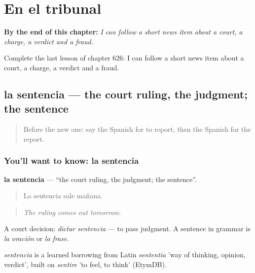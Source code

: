 
\chapter{En el tribunal}
\label{ch:es-en-el-tribunal}

\begin{chapteropening}
\textbf{By the end of this chapter:} \emph{I can follow a short news item about a court, a charge, a verdict and a fraud.}

Complete the last lesson of chapter 626: I can follow a short news item about a court, a charge, a verdict and a fraud.
\end{chapteropening}

\section[la sentencia]{la sentencia — the court ruling, the judgment; the sentence}

\label{lesson:ES-C626-sentencia}



\begin{quote}
Before the new one: say the Spanish for to report, then the Spanish for the report.
\end{quote}

\subsection*{You'll want to know: la sentencia}
\textbf{la sentencia} — \textquotedblleft{}the court ruling, the judgment; the sentence\textquotedblright{}.

\begin{quote}
La sentencia sale mañana.
\end{quote}

\begin{quote}
\emph{The ruling comes out tomorrow.}
\end{quote}

A court decision; \emph{dictar sentencia} — to pass judgment. A sentence in grammar is \emph{la oración} or \emph{la frase}.

\begin{cousinweb}
\emph{sentencia} is a learned borrowing from Latin \emph{sententia} 'way of thinking, opinion, verdict', built on \emph{sentire} 'to feel, to think' (EtymDB).
\end{cousinweb}

